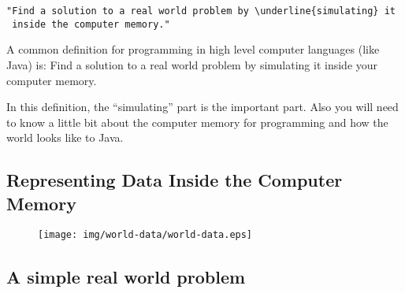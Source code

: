\documentclass[8pt, a4paper, oneside]{extarticle}
\begin{document}
\begin{multicols}{2}
\begin{Verbatim}
"Find a solution to a real world problem by \underline{simulating} it
 inside the computer memory."
\end{Verbatim}
  \columnbreak

  A common definition for programming in high level computer languages (like
  Java) is: Find a solution to a real world problem by simulating it inside
  your computer memory.

  In this definition, the ``simulating'' part is the important part. Also you
  will need to know a little bit about the computer memory for programming and
  how the world looks like to Java.

\end{multicols}

\subsection{Representing Data Inside the Computer Memory}

\begin{figure}[!ht]
  \centering
  \texttt{[image: img/world-data/world-data.eps]}
\end{figure}

\subsection{A simple real world problem}
\end{document}

